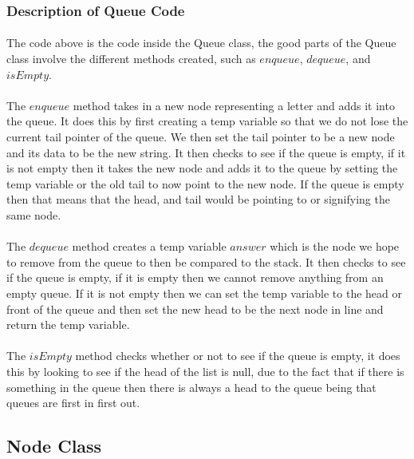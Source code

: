 \documentclass[letterpaper, 10pt,DIV=13]{scrartcl}
\numberwithin{equation}{section} %
\numberwithin{figure}{section} %
\numberwithin{table}{section} %
\begin{document}
\subsubsection{Description of Queue Code}
\paragraph{} The code above is the code inside the Queue class, the good parts of the Queue class involve the different methods created, such as $enqueue$, $dequeue$, and $isEmpty$.
\paragraph{} The $enqueue$ method takes in a new node representing a letter and adds it into the queue. It does this by first creating a temp variable so that we do not lose the current tail pointer of the queue. We then set the tail pointer to be a new node and its data to be the new string. It then checks to see if the queue is empty, if it is not empty then it takes the new node and adds it to the queue by setting the temp variable or the old tail to now point to the new node. If the queue is empty then that means that the head, and tail would be pointing to or signifying the same node.
\paragraph{} The $dequeue$ method creates a temp variable $answer$ which is the node we hope to remove from the queue to then be compared to the stack. It then checks to see if the queue is empty, if it is empty then we cannot remove anything from an empty queue. If it is not empty then we can set the temp variable to the head or front of the queue and then set the new head to be the next node in line and return the temp variable.
\paragraph{} The $isEmpty$ method checks whether or not to see if the queue is empty, it does this by looking to see if the head of the list is null, due to the fact that if there is something in the queue then there is always a head to the queue being that queues are first in first out.

\subsection{Node Class}
\end{document}
